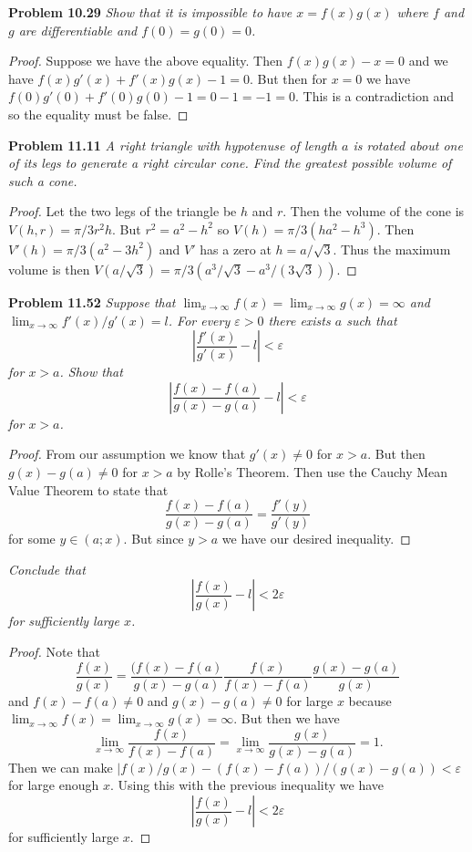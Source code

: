 \documentclass{article}
\begin{document}
\begin{flushleft}
\textbf{Problem 10.29}
\textsl{Show that it is impossible to have $x = f(x)g(x)$ where $f$ and $g$ are differentiable and $f(0) = g(0) = 0$.}
\begin{proof}
Suppose we have the above equality. Then $f(x)g(x) - x = 0$ and we have $f(x)g'(x) + f'(x)g(x) - 1 = 0$. But then for $x = 0$ we have $f(0)g'(0) + f'(0)g(0) - 1 = 0 - 1 = - 1 = 0$. This is a contradiction and so the equality must be false.
\end{proof}

\textbf{Problem 11.11}
\textsl{A right triangle with hypotenuse of length $a$ is rotated about one of its legs to generate a right circular cone. Find the greatest possible volume of such a cone.}
\begin{proof}
Let the two legs of the triangle be $h$ and $r$. Then the volume of the cone is $V(h,r) = \pi/3 r^2 h$. But $r^2 = a^2 - h^2$ so $V(h) = \pi/3 (ha^2 - h^3)$. Then $V'(h) = \pi/3 (a^2 - 3h^2)$ and $V'$ has a zero at $h=a/\sqrt{3}$. Thus the maximum volume is then $V(a/\sqrt{3}) = \pi/3 (a^3/\sqrt{3} - a^3/(3\sqrt{3}))$.
\end{proof}

\textbf{Problem 11.52}
\textsl{Suppose that $\lim_{x \rightarrow \infty} f(x) = \lim_{x \rightarrow \infty} g(x) = \infty$ and $\lim_{x \rightarrow \infty} f'(x) / g'(x) = l$. For every $\varepsilon > 0$ there exists $a$ such that
\[
\left | \frac{f'(x)}{g'(x)} - l \right | < \varepsilon
\]
for $x > a$. Show that
\[
\left | \frac{f(x) - f(a)}{g(x) - g(a)} - l \right | < \varepsilon
\]
for $x > a$.}
\begin{proof}
From our assumption we know that $g'(x) \neq 0$ for $x > a$. But then $g(x) - g(a) \neq 0$ for $x > a$ by Rolle's Theorem. Then use the Cauchy Mean Value Theorem to state that
\[
\frac{f(x) - f(a)}{g(x) - g(a)} = \frac{f'(y)}{g'(y)}
\]
for some $y \in (a;x)$. But since $y > a$ we have our desired inequality.
\end{proof}

\textsl{Conclude that
\[
\left | \frac{f(x)}{g(x)} - l \right | < 2 \varepsilon
\]
for sufficiently large $x$.}
\begin{proof}
Note that
\[
\frac{f(x)}{g(x)} = \frac{(f(x) - f(a)}{g(x) - g(a)} \frac{f(x)}{f(x)-f(a)} \frac{g(x)-g(a)}{g(x)}
\]
and $f(x) - f(a) \neq 0$ and $g(x) - g(a) \neq 0$ for large $x$ because $\lim_{x \rightarrow \infty} f(x) = \lim_{x \rightarrow \infty} g(x) = \infty$. But then we have
\[
\lim_{x \rightarrow \infty} \frac{f(x)}{f(x)-f(a)} = \lim_{x \rightarrow \infty} \frac{g(x)}{g(x)-g(a)} = 1.
\]
Then we can make $|f(x)/g(x) - (f(x)-f(a))/(g(x)-g(a)) < \varepsilon$ for large enough $x$. Using this with the previous inequality we have
\[
\left | \frac{f(x)}{g(x)} - l \right | < 2 \varepsilon
\]
for sufficiently large $x$.
\end{proof}


\end{flushleft}
\end{document}
